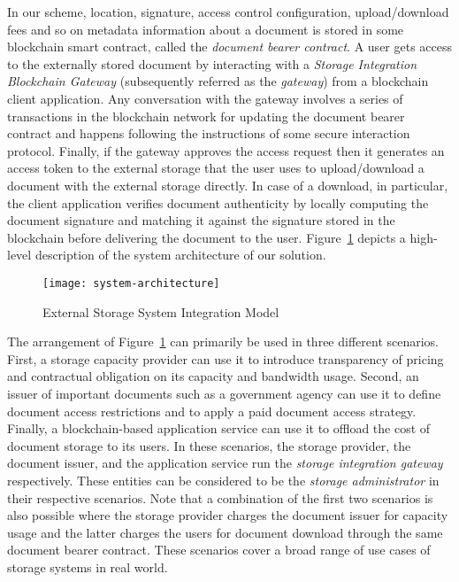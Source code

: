 In our scheme, location, signature, access control configuration, upload/download fees and so on metadata information about a document is stored in some blockchain smart contract, called the {\it document bearer contract}. A user gets access to the externally stored document by interacting with a \textit{Storage Integration Blockchain Gateway} (subsequently referred as the \textit{gateway}) from a blockchain client application. Any conversation with the gateway involves a series of transactions in the blockchain network for updating the document bearer contract and happens following the instructions of some secure interaction protocol. Finally, if the gateway approves the access request then it generates an access token to the external storage that the user uses to upload/download a document with the external storage directly. In case of a download, in particular, the client application verifies document authenticity by locally computing the document signature and matching it against the signature stored in the blockchain before delivering the document to the user. 
Figure~\ref{fig-1} depicts a high-level description of the system architecture of our solution.   
\begin{figure}[h]
\centering
\texttt{[image: system-architecture]}                    
\caption{External Storage System Integration Model}\label{fig-1}
\end{figure}

The arrangement of Figure~\ref{fig-1} can primarily be used in three different scenarios. First, a storage capacity provider can use it to introduce transparency of pricing and contractual obligation on its capacity and bandwidth usage. Second, an issuer of important documents such as a government agency can use it to define document access restrictions and to apply a paid document access strategy. Finally, a blockchain-based application service can use it to offload the cost of document storage to its users. In these scenarios, the storage provider, the document issuer, and the application service run the \textit{storage integration gateway} respectively. These entities can be considered to be the \textit{storage administrator} in their respective scenarios. Note that a combination of the first two scenarios is also possible where the storage provider charges the document issuer for capacity usage and the latter charges the users for document download through the same document bearer contract. These scenarios cover a broad range of use cases of storage systems in real world.          


